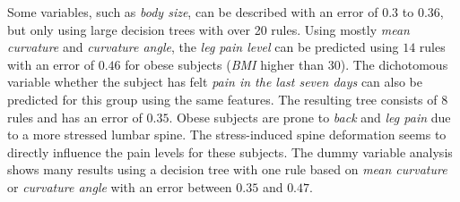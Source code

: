 \documentclass[a4paper,twoside]{style/article}
\begin{document}
Some variables, such as \emph{body size}, can be described with an error of $0.3$ to $0.36$, but only using large decision trees with over 20 rules.
Using mostly \emph{mean curvature} and \emph{curvature angle}, the \emph{leg pain level} can be predicted using $14$ rules with an error of $0.46$ for obese subjects (\emph{BMI} higher than $30$).
The dichotomous variable whether the subject has felt \emph{pain in the last seven days} can also be predicted for this group using the same features.
The resulting tree consists of $8$ rules and has an error of $0.35$.
Obese subjects are prone to \emph{back} and \emph{leg pain} due to a more stressed lumbar spine.
The stress-induced spine deformation seems to directly influence the pain levels for these subjects.
The dummy variable analysis shows many results using a decision tree with one rule based on \emph{mean curvature} or \emph{curvature angle} with an error between $0.35$ and $0.47$.
\end{document}
